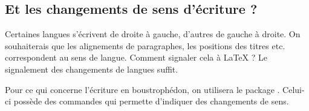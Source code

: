 \subsection{Et les changements de sens d'écriture ?}

Certaines langues s'écrivent de droite à gauche, d'autres de gauche à droite. On souhaiterais que les alignements de paragraphes, les positions des titres etc. correspondent au sens de langue. 
Comment signaler cela à LaTeX ? Le signalement des changements de langues suffit.

Pour ce qui concerne l'écriture en boustrophédon, on utilisera le package . Celui-ci possède des  commandes qui permette d'indiquer des changements de sens.


